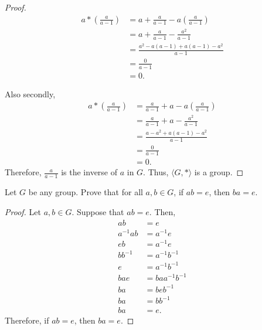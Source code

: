 \documentclass[12pt]{article}
\newenvironment{problem}[2][Problem]{\begin{trivlist}
\item[\hskip \labelsep {\bfseries #1}\hskip \labelsep {\bfseries #2.}]}{\end{trivlist}}
\begin{document}
\begin{problem}{2}
\begin{proof}
	$$
	\begin{aligned}
		a * (\frac{a}{a-1}) &= a + \frac{a}{a-1} - a(\frac{a}{a-1}) \\
		&= a + \frac{a}{a-1} - \frac{a^2}{a-1} \\
		&= \frac{a^2 -a(a-1) +a(a-1) -a^2}{a-1} \\
		&= \frac{0}{a-1} \\
		&= 0.
	\end{aligned}
	$$

	Also secondly,
	$$
	\begin{aligned}
		a * (\frac{a}{a-1}) &= \frac{a}{a-1} + a - a(\frac{a}{a-1}) \\
		&= \frac{a}{a-1} + a - \frac{a^2}{a-1} \\
		&= \frac{a - a^2 + a(a - 1) - a^2}{a - 1} \\
		&= \frac{0}{a - 1} \\
		&= 0.
	\end{aligned}
	$$
	Therefore, $\frac{a}{a-1}$ is the inverse of $a$ in $G$. Thus, $\langle G, *\rangle$ is a group.

\end{proof}
\end{problem}

\begin{problem}{3}
	Let $G$ be any group. Prove that for all $a, b \in G$, if $a b=e$, then $b a=e$.
\begin{proof}
Let $a, b \in G$. Suppose that $a b=e$.
Then,
$$
\begin{aligned}
	a b &= e \\
	a^{-1} a b &= a^{-1} e \\
	e b &= a^{-1} e \\
	b b^{-1} &= a^{-1} b^{-1} \\
	e &= a^{-1} b^{-1} \\
	b a e &= b a a^{-1} b^{-1} \\
	b a &= b e b^{-1} \\
	b a &= b b^{-1} \\
	b a &= e.
\end{aligned}
$$
Therefore, if $a b=e$, then $b a=e$.
\end{proof}

\end{problem}
\end{document}
